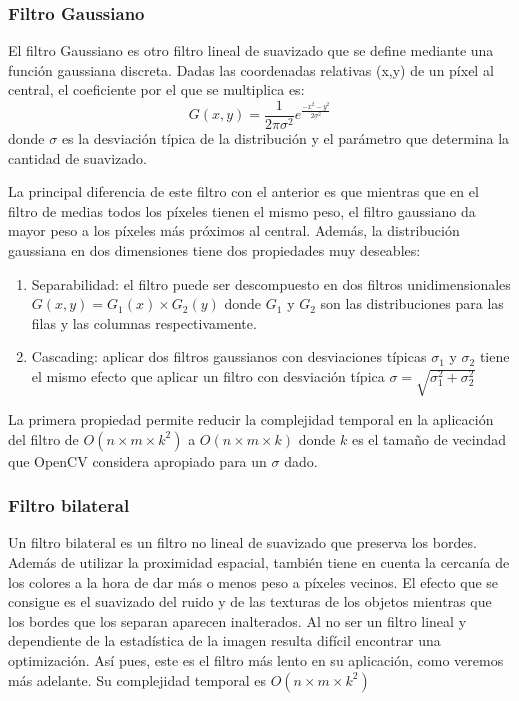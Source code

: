\documentclass[12pt]{article}
\begin{document}
\subsubsection{Filtro Gaussiano}
El filtro Gaussiano es otro filtro lineal de suavizado que se define mediante una función gaussiana discreta. Dadas las coordenadas relativas (x,y) de un píxel al central, el coeficiente por el que se multiplica es:
$$
    G(x,y) = \frac{1}{2 \pi \sigma^2}e^\frac{-x^2-y^2}{2\sigma^2}
$$
donde $\sigma$ es la desviación típica de la distribución y el parámetro que determina la cantidad de suavizado.

La principal diferencia de este filtro con el anterior es que mientras que en el filtro de medias todos los píxeles tienen el mismo peso, el filtro gaussiano da mayor peso a los píxeles más próximos al central.
Además, la distribución gaussiana en dos dimensiones tiene dos propiedades muy deseables:
\begin{enumerate}
    \item Separabilidad: el filtro puede ser descompuesto en dos filtros unidimensionales $G(x,y) = G_1(x) \times G_2(y)$ donde $G_1$ y $G_2$ son las distribuciones para las filas y las columnas respectivamente.
    \item Cascading: aplicar dos filtros gaussianos con desviaciones típicas $\sigma_1$ y $\sigma_2$ tiene el mismo efecto que aplicar un filtro con desviación típica $\sigma = \sqrt{\sigma_{1}^{2} + \sigma_{2}^{2}}$
\end{enumerate}
La primera propiedad permite reducir la complejidad temporal en la aplicación del filtro de $O(n \times m \times k^2)$ a $O(n \times m \times k)$ donde $k$ es el tamaño de vecindad que OpenCV considera apropiado para un $\sigma$ dado.

\subsubsection{Filtro bilateral}

Un filtro bilateral es un filtro no lineal de suavizado que preserva los bordes. 
Además de utilizar la proximidad espacial, también tiene en cuenta la cercanía de los colores a la hora de dar más o menos peso a píxeles vecinos.
El efecto que se consigue es el suavizado del ruido y de las texturas de los objetos mientras que los bordes que los separan aparecen inalterados. 
Al no ser un filtro lineal y dependiente de la estadística de la imagen resulta difícil encontrar una optimización. Así pues, este es el filtro más lento en su aplicación, como veremos más adelante.
Su complejidad temporal es $O(n \times m \times k^2)$
\end{document}
